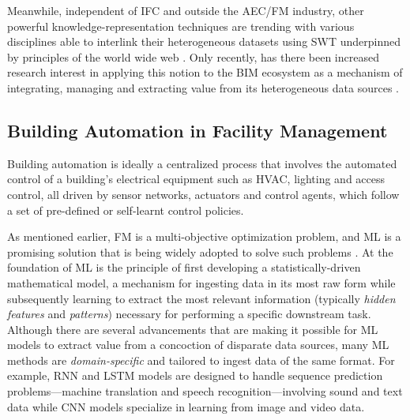 Meanwhile, independent of \ac{IFC} and outside the \ac{AEC/FM} industry, other powerful knowledge-representation techniques are trending with various disciplines able to interlink their heterogeneous datasets using \ac{SWT} underpinned by principles of the world wide web \citep{Berners-Lee2001,Berners-Lee2003, Berners-Lee2006}. Only recently, has there been increased research interest in applying this notion to the \ac{BIM} ecosystem as a mechanism of integrating, managing and extracting value from its heterogeneous data sources \citep{Barbau2012,Beetz2009,Pauwels2016a,Pauwels2016}.

\subsection{Building Automation in Facility Management}

Building automation is ideally a centralized process that involves the automated control of a building's electrical equipment such as \ac{HVAC}, lighting and access control, all driven by sensor networks, actuators and control agents, which follow a set of pre-defined or self-learnt control policies.  

As mentioned earlier, \ac{FM} is a multi-objective optimization problem, and \ac{ML} is a promising solution that is being widely adopted to solve such problems \citep{Toffolo2002, Asadi2012Multi-objectiveApplication, Shaikh2018, Chen2018b, Merlet2022IntegrationRetrofit, Wijeratne2022Multi-objectivePhase}. At the foundation of ML is the principle of first developing a statistically-driven mathematical model, a mechanism for ingesting data in its most raw form while subsequently learning to extract the most relevant information (typically \textit{hidden} \textit{features} and  \textit{patterns}) necessary for performing a specific downstream task. Although there are several advancements that are making it possible for \ac{ML} models to extract value from a concoction of disparate data sources, many \ac{ML} methods are \textit{domain-specific} and tailored to ingest data of the same format. For example, \ac{RNN} and \ac{LSTM} models \citep{Hochreiter1997LongMemory} are designed to handle sequence prediction problems---machine translation and speech recognition---involving sound and text data while \ac{CNN} models \citep{LeCun1998Gradient-basedRecognition} specialize in learning from image and video data.     

